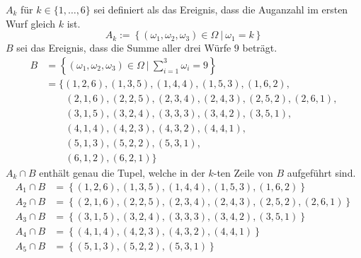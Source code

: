 \documentclass[a4paper]{scrartcl}
\begin{document}
\begin{enumerate}[label=\bfseries\arabic*.]
        $A_k$ für $k \in \{1, \ldots, 6\}$ sei definiert als das Ereignis, dass
        die Auganzahl im ersten Wurf gleich $k$ ist.
        \begin{equation*}
            A_k := \left\{ (\omega_1, \omega_2, \omega_3) \in \Omega \ \vert \ 
            \omega_1 = k \right\}
        \end{equation*}
        $B$ sei das Ereignis, dass die Summe aller drei Würfe $9$ beträgt.
        \begin{equation*}
            \begin{split}
                B &= \left\{ (\omega_1, \omega_2, \omega_3) \in \Omega \ \vert\ 
                    \sum_{i=1}^3 \omega_i = 9 \right\} \\
                    &= \Big\{ 
                            (1, 2, 6), (1, 3, 5), (1, 4, 4), (1, 5, 3),
                            (1, 6, 2), \\
                    &\qquad (2, 1, 6), (2, 2, 5), (2, 3, 4), (2, 4, 3),
                            (2, 5, 2), (2, 6, 1), \\
                    &\qquad (3, 1, 5), (3, 2, 4), (3, 3, 3), (3, 4, 2),
                            (3, 5, 1), \\
                    &\qquad (4, 1, 4), (4, 2, 3), (4, 3, 2), (4, 4, 1), \\
                    &\qquad (5, 1, 3), (5, 2, 2), (5, 3, 1), \\
                    &\qquad (6, 1, 2), (6, 2, 1)
                    \Big\}
            \end{split}
        \end{equation*}
        $A_k \cap B$ enthält genau die Tupel, welche in der $k$-ten Zeile von
        $B$ aufgeführt sind.
        \begin{align*}
            A_1 \cap B &= \left\{ (1, 2, 6), (1, 3, 5), (1, 4, 4), (1, 5, 3),
                                  (1, 6, 2) \right\} \\
            A_2 \cap B &= \left\{ (2, 1, 6), (2, 2, 5), (2, 3, 4), (2, 4, 3),
                                  (2, 5, 2), (2, 6, 1) \right\} \\
            A_3 \cap B &= \left\{ (3, 1, 5), (3, 2, 4), (3, 3, 3), (3, 4, 2),
                                  (3, 5, 1) \right\} \\
            A_4 \cap B &= \left\{ (4, 1, 4), (4, 2, 3), (4, 3, 2), (4, 4, 1)
                          \right\} \\
            A_5 \cap B &= \left\{ (5, 1, 3), (5, 2, 2), (5, 3, 1) \right\} \\

\end{align*}
\end{enumerate}
\end{document}
